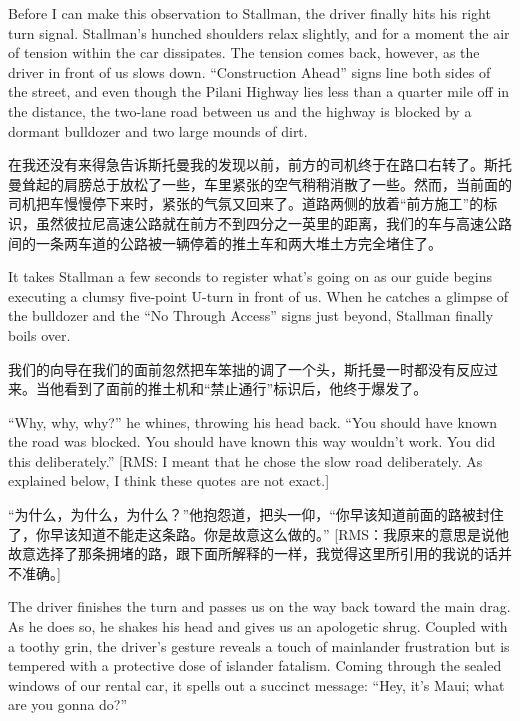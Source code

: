 \ifdefined\eng
Before I can make this observation to Stallman, the driver finally hits his right turn signal. Stallman's hunched shoulders relax slightly, and for a moment the air of tension within the car dissipates. The tension comes back, however, as the driver in front of us slows down. ``Construction Ahead'' signs line both sides of the street, and even though the Pilani Highway lies less than a quarter mile off in the distance, the two-lane road between us and the highway is blocked by a dormant bulldozer and two large mounds of dirt.
\fi

\ifdefined\chs
在我还没有来得急告诉斯托曼我的发现以前，前方的司机终于在路口右转了。斯托曼耸起的肩膀总于放松了一些，车里紧张的空气稍稍消散了一些。然而，当前面的司机把车慢慢停下来时，紧张的气氛又回来了。道路两侧的放着“前方施工”的标识，虽然彼拉尼高速公路就在前方不到四分之一英里的距离，我们的车与高速公路间的一条两车道的公路被一辆停着的推土车和两大堆土方完全堵住了。
\fi

\ifdefined\eng
It takes Stallman a few seconds to register what's going on as our guide begins executing a clumsy five-point U-turn in front of us. When he catches a glimpse of the bulldozer and the ``No Through Access'' signs just beyond, Stallman finally boils over.
\fi

\ifdefined\chs
我们的向导在我们的面前忽然把车笨拙的调了一个头，斯托曼一时都没有反应过来。当他看到了面前的推土机和“禁止通行”标识后，他终于爆发了。
\fi

\ifdefined\eng
``Why, why, why?'' he whines, throwing his head back. ``You should have known the road was blocked. You should have known this way wouldn't work. You did this deliberately.''  [RMS: I meant that he chose the slow road deliberately.  As explained below, I think these quotes are not exact.]
\fi

\ifdefined\chs
“为什么，为什么，为什么？”他抱怨道，把头一仰，“你早该知道前面的路被封住了，你早该知道不能走这条路。你是故意这么做的。” [RMS：我原来的意思是说他故意选择了那条拥堵的路，跟下面所解释的一样，我觉得这里所引用的我说的话并不准确。]
\fi

\ifdefined\eng
The driver finishes the turn and passes us on the way back toward the main drag. As he does so, he shakes his head and gives us an apologetic shrug. Coupled with a toothy grin, the driver's gesture reveals a touch of mainlander frustration but is tempered with a protective dose of islander fatalism. Coming through the sealed windows of our rental car, it spells out a succinct message: ``Hey, it's Maui; what are you gonna do?''
\fi

